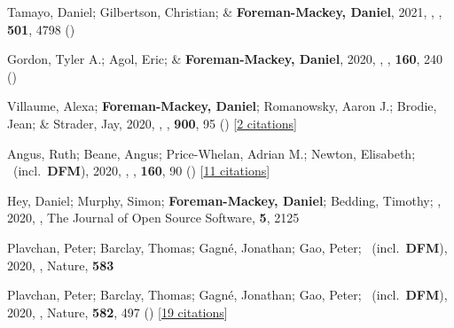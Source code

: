 \item[{\color{numcolor}\scriptsize61}] Tamayo, Daniel; Gilbertson, Christian; \& \textbf{Foreman-Mackey, Daniel}, 2021, , \mnras, \textbf{501}, 4798 ()

\item[{\color{numcolor}\scriptsize60}] Gordon, Tyler A.; Agol, Eric; \& \textbf{Foreman-Mackey, Daniel}, 2020, , \aj, \textbf{160}, 240 ()

\item[{\color{numcolor}\scriptsize59}] Villaume, Alexa; \textbf{Foreman-Mackey, Daniel}; Romanowsky, Aaron J.; Brodie, Jean; \& Strader, Jay, 2020, , \apj, \textbf{900}, 95 () [\href{https://ui.adsabs.harvard.edu/abs/2020ApJ...900...95V}{2 citations}]

\item[{\color{numcolor}\scriptsize58}] Angus, Ruth; Beane, Angus; Price-Whelan, Adrian M.; Newton, Elisabeth; \etal\ (incl.\ \textbf{DFM}), 2020, , \aj, \textbf{160}, 90 () [\href{https://ui.adsabs.harvard.edu/abs/2020AJ....160...90A}{11 citations}]

\item[{\color{numcolor}\scriptsize57}] Hey, Daniel; Murphy, Simon; \textbf{Foreman-Mackey, Daniel}; Bedding, Timothy; \etal, 2020, , The Journal of Open Source Software, \textbf{5}, 2125

\item[{\color{numcolor}\scriptsize56}] Plavchan, Peter; Barclay, Thomas; Gagn{\'e}, Jonathan; Gao, Peter; \etal\ (incl.\ \textbf{DFM}), 2020, , Nature, \textbf{583}

\item[{\color{numcolor}\scriptsize55}] Plavchan, Peter; Barclay, Thomas; Gagn{\'e}, Jonathan; Gao, Peter; \etal\ (incl.\ \textbf{DFM}), 2020, , Nature, \textbf{582}, 497 () [\href{https://ui.adsabs.harvard.edu/abs/2020Natur.582..497P}{19 citations}]

